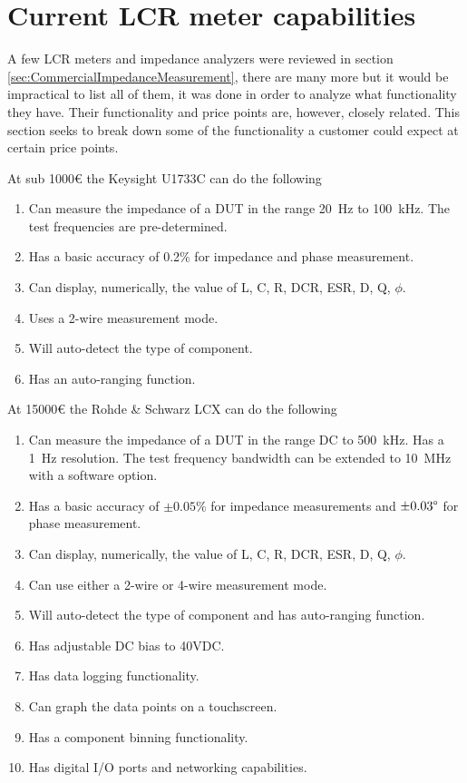 \section{Current LCR meter capabilities} \label{sec:CurrentLCRMeterCapabilities}
A few LCR meters and impedance analyzers were reviewed in section \ref{sec:CommercialImpedanceMeasurement}, there are many more but it would be impractical to list all of them, it was done in order to analyze what functionality they have. Their functionality and price points are, however, closely related. This section seeks to break down some of the functionality a customer could expect at certain price points.

At sub 1000€ the Keysight U1733C can do the following
\begin{enumerate}
  \item Can measure the impedance of a DUT in the range \SI[]{20}{\hertz} to \SI[]{100}{\kilo\hertz}. The test frequencies are pre-determined.
  \item Has a basic accuracy of 0.2\% for impedance and phase measurement.
  \item Can display, numerically, the value of L, C, R, DCR, ESR, D, Q, $\phi$.
  \item Uses a 2-wire measurement mode.
  \item Will auto-detect the type of component.
  \item Has an auto-ranging function.
\end{enumerate}

At 15000€ the Rohde \& Schwarz LCX can do the following
\begin{enumerate}
    \item Can measure the impedance of a DUT in the range DC to \SI[]{500}{\kilo\hertz}. Has a \SI[]{1}{\hertz} resolution. The test frequency bandwidth can be extended to \SI[]{10}{\mega\hertz} with a software option.
    \item Has a basic accuracy of $\pm 0.05\%$ for impedance measurements and $\pm 0.03\degree$ for phase measurement.
    \item Can display, numerically, the value of L, C, R, DCR, ESR, D, Q, $\phi$.
    \item Can use either a 2-wire or 4-wire measurement mode.
    \item Will auto-detect the type of component and has auto-ranging function.
    \item Has adjustable DC bias to 40VDC.
    \item Has data logging functionality.
    \item Can graph the data points on a touchscreen.
    \item Has a component binning functionality.
    \item Has digital I/O ports and networking capabilities.
  \end{enumerate}

